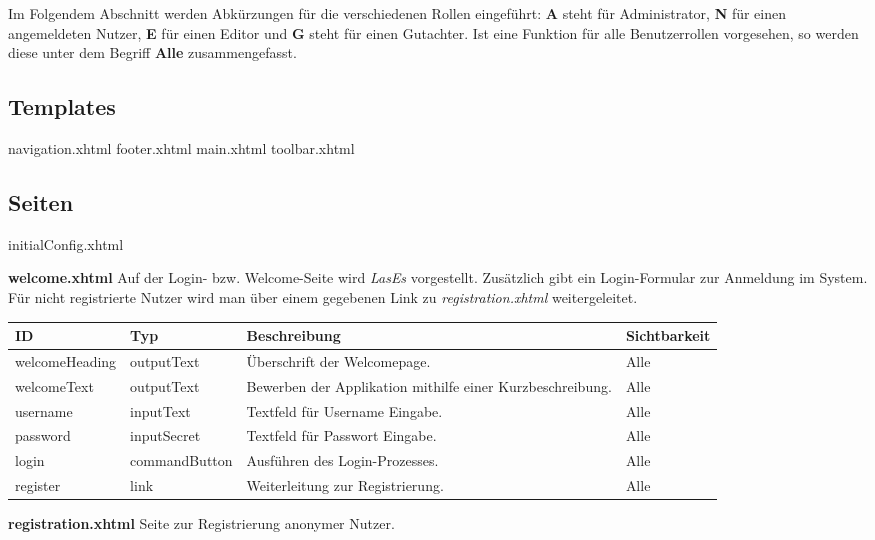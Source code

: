 Im Folgendem Abschnitt werden Abkürzungen für die verschiedenen Rollen eingeführt:
\textbf{A} steht für Administrator, \textbf{N} für einen angemeldeten Nutzer, \textbf{E} für einen Editor und \textbf{G} steht für einen Gutachter.
Ist eine Funktion für alle Benutzerrollen vorgesehen, so werden diese unter dem Begriff \textbf{Alle} zusammengefasst.


\subsection{Templates}
navigation.xhtml
footer.xhtml
main.xhtml
toolbar.xhtml

\subsection{Seiten}
initialConfig.xhtml

\textbf{welcome.xhtml} Auf der Login- bzw. Welcome-Seite wird \emph{LasEs} vorgestellt.
Zusätzlich gibt ein Login-Formular zur Anmeldung im System.
Für nicht registrierte Nutzer wird man über einem gegebenen Link zu \emph{registration.xhtml} weitergeleitet.


\begin{tabular}[H]{|m{2cm}|m{3cm}|m{6cm}|m{2.5cm}|}
    \hline
    \textbf{ID} & \textbf{Typ} & \textbf{Beschreibung} & \textbf{Sichtbarkeit} \\
    \hline
    \hline
    welcomeHeading & outputText & Überschrift der Welcomepage. & Alle\\
    \hline
    welcomeText & outputText & Bewerben der Applikation mithilfe einer Kurzbeschreibung. & Alle \\
    \hline
    username & inputText & Textfeld für Username Eingabe. & Alle \\
    \hline
    password & inputSecret & Textfeld für Passwort Eingabe. & Alle \\
    \hline
    login & commandButton & Ausführen des Login-Prozesses. & Alle \\
    \hline
    register & link & Weiterleitung zur Registrierung. & Alle \\
    \hline
\end{tabular}

\textbf{registration.xhtml} Seite zur Registrierung anonymer Nutzer.

